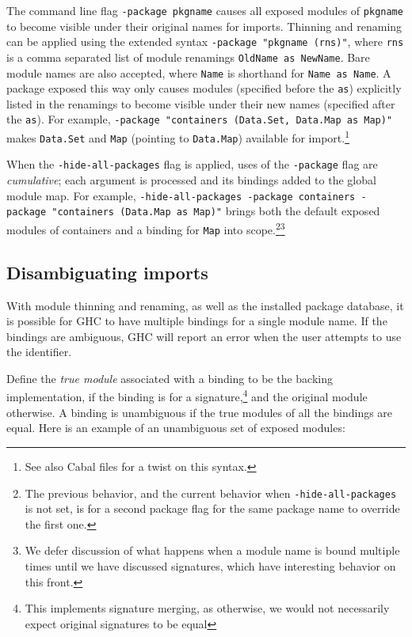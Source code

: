 \documentclass{article}
\begin{document}
The command line flag \texttt{-package pkgname} causes all
exposed modules of \texttt{pkgname} to become visible under their
original names for imports.  Thinning and renaming can be applied
using the extended syntax \texttt{-package "pkgname
(rns)"}, where \texttt{rns} is a comma separated list of
module renamings \texttt{OldName as NewName}.  Bare module names are
also accepted, where \texttt{Name} is shorthand for \texttt{Name as
Name}.  A package exposed this way only causes modules (specified before
the \texttt{as}) explicitly listed in the renamings to become visible
under their new names (specified after the \texttt{as}).  For example,
\texttt{-package "containers (Data.Set, Data.Map as Map)"} makes
\texttt{Data.Set} and \texttt{Map} (pointing to
\texttt{Data.Map}) available for import.\footnote{See also Cabal files
for a twist on this syntax.}

When the \texttt{-hide-all-packages} flag is applied, uses of the
\texttt{-package} flag are \emph{cumulative}; each argument is processed
and its bindings added to the global module map.  For example,
\texttt{-hide-all-packages -package containers -package "containers
(Data.Map as Map)"} brings both the default exposed modules of
containers and a binding for \texttt{Map} into scope.\footnote{The
previous behavior, and the current behavior when
\texttt{-hide-all-packages} is not set, is for a second package flag for
the same package name to override the first one.}\footnote{We defer
discussion of what happens when a module name is bound multiple times until
we have discussed signatures, which have interesting behavior on this front.}

\subsection{Disambiguating imports}

With module thinning and renaming, as well as the installed package
database, it is possible for GHC to have multiple bindings for a single
module name.  If the bindings are ambiguous, GHC will report an error
when the user attempts to use the identifier.

Define the \emph{true module} associated with a binding to be the
backing implementation, if the binding is for a signature,\footnote{This
implements signature merging, as otherwise, we would not necessarily
expect original signatures to be equal} and the original module
otherwise.  A binding is unambiguous if the true modules of all the
bindings are equal.  Here is an example of an unambiguous set of exposed
modules:
\end{document}
